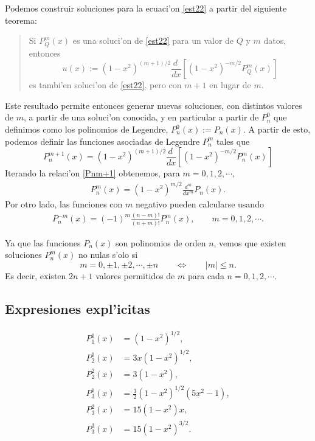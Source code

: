 Podemos construir soluciones para la ecuaci'on \eqref{est22} a partir del siguiente teorema:
\begin{quote}
Si $P_Q^m(x)$ es una soluci'on de \eqref{est22} para un valor de $Q$ y $m$ datos, entonces 
\begin{equation}
u(x):=(1-x^2)^{(m+1)/2}\frac{d\ }{dx}\left[(1-x^2)^{-m/2}P_Q^m(x)\right]
\end{equation}
es tambi'en soluci'on de \eqref{est22}, pero con $m+1$ en lugar de $m$.
\end{quote}
Este resultado permite entonces generar nuevas soluciones, con distintos valores de $m$, a partir de una soluci'on conocida, y en particular a partir de $P_n^0$ que definimos como los polinomios de Legendre, $P_n^0(x):=P_n(x)$. A partir de esto, podemos definir las funciones asociadas de Legendre $P_n^m$ tales que
\begin{equation}\label{Pnm+1}
P_n^{m+1}(x)=(1-x^2)^{(m+1)/2}\frac{d\ }{dx}\left[(1-x^2)^{-m/2}P_n^m(x)\right]
\end{equation}
Iterando la relaci'on \eqref{Pnm+1} obtenemos, para $m=0,1,2,\cdots$, 
\begin{eqnarray}\label{Pnm}
P_n^m(x) =(1-x^2)^{m/2}\frac{d^m}{dx^m} P_n(x).
\end{eqnarray}
Por otro lado, las funciones con $m$ negativo pueden calcularse usando
\begin{eqnarray}
P_n^{-m}(x) = (-1)^m\frac{(n-m)!}{(n+m)!} P_n^m(x), \qquad m=0,1,2,\cdots.
\label{est29}
\end{eqnarray}

Ya que las funciones $P_n(x)$ son polinomios de orden $n$, vemos que existen soluciones $P_n^m(x)$ no nulas s'olo si
\begin{equation}
  m=0,\pm 1,\pm 2,\cdots,\pm n \qquad\Leftrightarrow\qquad
  |m|\leq n.
\end{equation}
Es decir, existen $2n+1$ valores permitidos de $m$ para cada $n=0,1,2,\cdots$.

\subsection{Expresiones expl'icitas}
\begin{align}
P_1^1(x) &= (1-x^2)^{1/2}, \\
P_2^1(x) &= 3x(1-x^2)^{1/2}, \\
P_2^2(x) &= 3(1-x^2), \\
P_3^1(x) &= \frac{3}{2}(1-x^2)^{1/2}(5x^2-1), \\
P_3^2(x) &= 15(1-x^2)x, \\
P_3^3(x) &= 15(1-x^2)^{3/2}. \\
\end{align}

